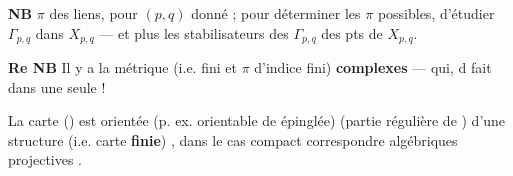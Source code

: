 \documentclass[11pt,a4paper]{article}
\begin{document}
\textbf{NB} $\pi$ \ill{} des liens, pour \ill{} $(p,q)$ donné ; pour
déterminer les $\pi$ possibles, d'étudier \ill{} $\Gamma_{p,q}$ dans
$X_{p,q}$ — et plus \ill{} les \struck{\ill{}} \ill{} stabilisateurs des
$\Gamma_{p,q}$ des pts de $X_{p,q}$.

\struck{\ill{}} \textbf{Re NB} Il y a la \ill{} \ill{} métrique \ill{} \ill{}
 \ill{} (i.e. \struck{\ill{}} fini et $\pi$ d'indice
fini) \ill{} \textbf{complexes} — qui, d\ill{} fait dans une \ill{} seule !

La carte () est orientée (p. ex. orientable de \ill{}
\struck{\ill{}} épinglée) \ill{} (partie régulière de \ill{}) d'une structure
(i.e. carte \textbf{finie}) \ill{}, dans le cas compact \ill{} correspondre
\ill{} algébriques projectives \ill{} \struck{\ill{}}
.

\end{document}
